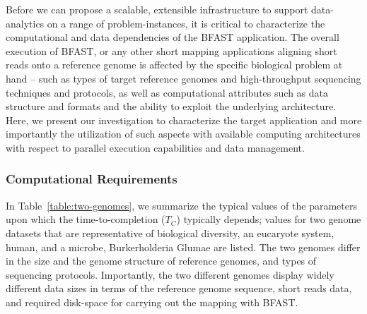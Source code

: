 \documentclass{acm_proc_article-sp}
\begin{document}

Before we can propose a scalable, extensible infrastructure to support
data-analytics on a range of problem-instances, it is critical to
characterize the computational and data dependencies of the BFAST
application.  The overall execution of BFAST, or any other short
mapping applications aligning short reads onto a reference genome is
affected by the specific biological problem at hand -- such as types
of target reference genomes and high-throughput sequencing techniques
and protocols, as well as computational attributes such as data
structure and formats and the ability to exploit the underlying
architecture.  Here, we present our investigation to characterize the
target application and more importantly the utilization of such
aspects with available computing architectures with respect to
parallel execution capabilities and data management.

\subsubsection{Computational Requirements}


In Table~\ref{table:two-genomes}, we summarize the typical values of
the parameters upon which the time-to-completion ($T_C$) typically
depends; values for two genome datasets that are representative of
biological diversity, an eucaryote system, human, and a microbe,
Burkerholderia Glumae\cite{kim2011} are listed. The two genomes differ
in the size and the genome structure of reference genomes, and types
of sequencing protocols.  Importantly, the two different genomes
display widely different data sizes in terms of the reference genome
sequence, short reads data, and required disk-space for carrying out
the mapping with BFAST.
\end{document}
